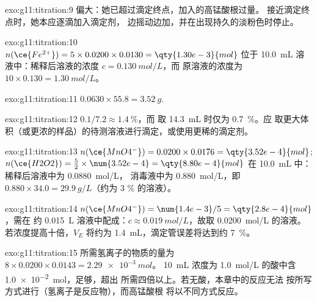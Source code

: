 \begin{solution}{exo:g11:titration:9}
偏大：她已超过滴定终点，加入的高锰酸根过量。
接近滴定终点时，她本应逐滴加入滴定剂，
边摇动边加，并在出现持久的淡粉色时停止。
\end{solution}

\begin{solution}{exo:g11:titration:10}
$n(\ce{Fe^{2+}}) = 5 \times 0.0200 \times 0.0130 = \qty{1.30e-3}{mol}$ 位于
\qty{10.0}{mL} 溶液中：稀释后溶液的浓度 $c = \qty{0.130}{mol/L}$，而
原溶液的浓度为 $10 \times 0.130 = \qty{1.30}{mol/L}$。
\end{solution}

\begin{solution}{exo:g11:titration:11}
$0.0630 \times 55.8 = \qty{3.52}{g}$.
\end{solution}

\begin{solution}{exo:g11:titration:12}
$0.1 / 7.2 \approx \qty{1.4}{\percent}$，而
取 \qty{14.3}{mL} 时仅为 \qty{0.7}{\percent}。应
取更大体积（或更浓的样品）的待测溶液进行滴定，或使用更稀的滴定剂。
\end{solution}

\begin{solution}{exo:g11:titration:13}
$n(\ce{MnO4^-}) = 0.0200 \times 0.0176 = \qty{3.52e-4}{mol}$;
$n(\ce{H2O2}) = \frac{5}{2} \times \num{3.52e-4} = \qty{8.80e-4}{mol}$ 在
\qty{10.0}{mL} 中：稀释后溶液中为 \qty{0.0880}{mol/L}，
消毒液中为 \qty{0.880}{mol/L}，即
$0.880 \times 34.0 = \qty{29.9}{g/L}$（约为 3 \% 的溶液）。
\end{solution}

\begin{solution}{exo:g11:titration:14}
$n(\ce{MnO4^-}) = \num{1.4e-3} / 5 = \qty{2.8e-4}{mol}$，需在
约 \qty{0.015}{L} 溶液中配成：$c \approx \qty{0.019}{mol/L}$，故取
\qty{0.0200}{mol/L} 的溶液。若浓度提高十倍，$V_E$ 将约为
\qty{1.4}{mL}，滴定管误差将达到约
\qty{7}{\percent}。
\end{solution}

\begin{solution}{exo:g11:titration:15}
所需氢离子的物质的量为 $8 \times 0.0200 \times 0.0143 = \qty{2.29e-3}{mol}$。
\qty{10}{mL} 浓度为 \qty{1.0}{mol/L} 的酸中含 \qty{1.0e-2}{mol}，足够，超出
所需四倍以上。若无酸，本章中的反应无法
按所写方式进行（氢离子是反应物），而高锰酸根
将以不同方式反应。
\end{solution}

